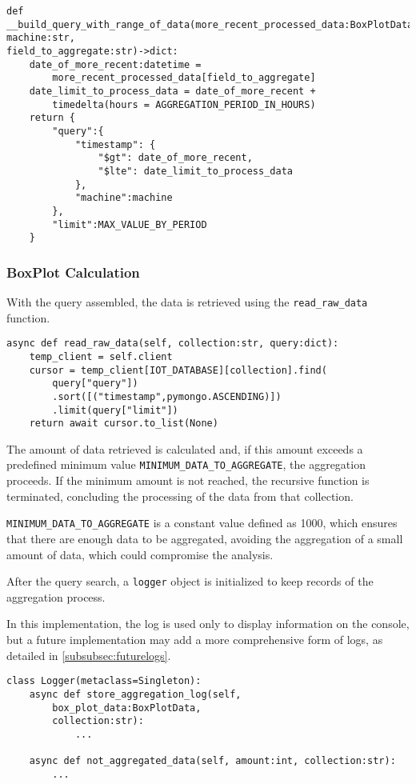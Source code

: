 \begin{Verbatim}[fontsize=\small, baselinestretch=0.8]
def __build_query_with_range_of_data(more_recent_processed_data:BoxPlotData,
machine:str,
field_to_aggregate:str)->dict:
    date_of_more_recent:datetime = 
        more_recent_processed_data[field_to_aggregate]
    date_limit_to_process_data = date_of_more_recent + 
        timedelta(hours = AGGREGATION_PERIOD_IN_HOURS)
    return {
        "query":{
            "timestamp": {
                "$gt": date_of_more_recent,
                "$lte": date_limit_to_process_data
            },
            "machine":machine
        },
        "limit":MAX_VALUE_BY_PERIOD
    }
\end{Verbatim}

\subsubsection{BoxPlot Calculation}
With the query assembled, the data is retrieved using the \texttt{read\_raw\_data} function.

\begin{Verbatim}[fontsize=\small, baselinestretch=0.8]
async def read_raw_data(self, collection:str, query:dict):
    temp_client = self.client
    cursor = temp_client[IOT_DATABASE][collection].find(
        query["query"])
        .sort([("timestamp",pymongo.ASCENDING)])
        .limit(query["limit"])
    return await cursor.to_list(None)
\end{Verbatim}

The amount of data retrieved is calculated and, if this amount exceeds a predefined minimum value \texttt{MINIMUM\_DATA\_TO\_AGGREGATE}, the aggregation proceeds. If the minimum amount is not reached, the recursive function is terminated, concluding the processing of the data from that collection.

\texttt{MINIMUM\_DATA\_TO\_AGGREGATE} is a constant value defined as 1000, which ensures that there are enough data to be aggregated, avoiding the aggregation of a small amount of data, which could compromise the analysis.

After the query search, a \texttt{logger} object is initialized to keep records of the aggregation process.

In this implementation, the log is used only to display information on the console, but a future implementation may add a more comprehensive form of logs, as detailed in \ref{subsubsec:futurelogs}.

\begin{Verbatim}[fontsize=\small, baselinestretch=0.8]
class Logger(metaclass=Singleton):
    async def store_aggregation_log(self,
        box_plot_data:BoxPlotData,
        collection:str):
            ...
            
    async def not_aggregated_data(self, amount:int, collection:str):
        ...
\end{Verbatim}

